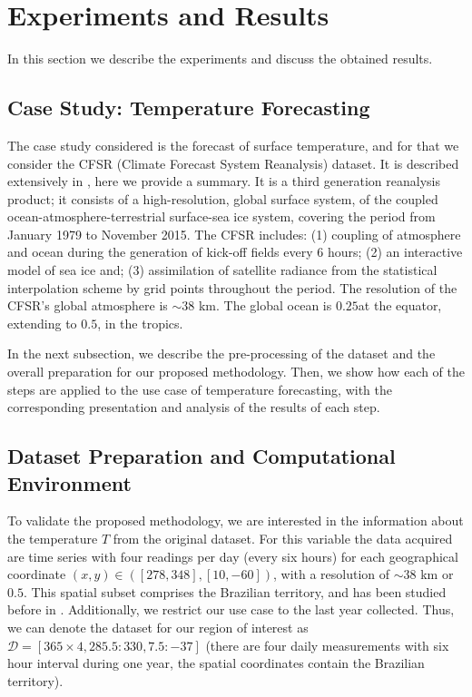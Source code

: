 \section{Experiments and Results}

In this section we describe the experiments and discuss the obtained results.

\subsection{Case Study: Temperature Forecasting}

The case study considered is the forecast of surface temperature, and for that we consider the CFSR (Climate Forecast System Reanalysis) dataset. It is described extensively in \cite{Saha2010}, here we provide a summary. It is a third generation reanalysis product; it consists of a high-resolution, global surface system, of the coupled ocean-atmosphere-terrestrial surface-sea ice system, covering the period from January 1979 to November 2015. The CFSR includes: (1) coupling of atmosphere and ocean during the generation of kick-off fields every 6 hours; (2) an interactive model of sea ice and; (3) assimilation of satellite radiance from the statistical interpolation scheme by grid points throughout the period. The resolution of the CFSR's global atmosphere is $\sim 38$ km. The global ocean is $0.25$\textdegree at the equator, extending to $0.5$\textdegree, in the tropics. 

In the next subsection, we describe the pre-processing of the dataset and the overall preparation for our proposed methodology. Then, we show how each of the steps are applied to the use case of temperature forecasting, with the corresponding presentation and analysis of the results of each step.

\subsection{Dataset Preparation and Computational Environment}
\label{sec:DatasetPreparation}

To validate the proposed methodology, we are interested in the information about the temperature $T$ from the original dataset. For this variable the data acquired are time series with four readings per day (every six hours) for each geographical coordinate $(x,y)\in ([278, 348], [10, -60])$, with a resolution of $\sim 38$ km or $0.5$\textdegree. This spatial subset comprises the Brazilian territory, and has been studied before in \cite{Souto2018}. Additionally, we restrict our use case to the last year collected. Thus, we can denote the dataset for our region of interest as $\mathcal{D} = [ 365\times 4, 285.5:330, 7.5:-37]$ (there are four daily measurements with six hour interval during one year, the spatial coordinates contain the Brazilian territory). 

